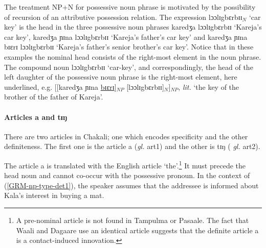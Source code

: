 \begin{exe}
\begin{exe}
\begin{exe}
{\begin{exe}
\begin{exe}
The treatment  NP+N for possessive noun phrase is   motivated  by the 
possibility of  recursion of  an attributive possession relation. The expression 
{\sls lɔɔlɪgbɛrbɪɪ}$_{N}$  `car key' is the head in the three possessive noun 
phrases   {\sls karedʒa lɔɔlɪgbɛrbɪɪ} `Kareja's car key', {\sls karedʒa ɲɪna 
lɔɔlɪgbɛrbɪɪ} `Kareja's father's car key' and {\sls karedʒa ɲɪna bɪɛrɪ 
lɔɔlɪgbɛrbɪɪ} `Kareja's father's senior brother's car  key'.  Notice that in 
these examples the nominal head consists of the right-most element in the noun 
phrase. The compound noun  {\sls  lɔɔlɪgbɛrbɪɪ}  `car-key', and correspondingly, 
the head of the left daughter of the  possessive noun phrase is the right-most 
element, here underlined,  e.g.   [[{\sls karedʒa ɲɪna 
\underline{bɪɛrɪ}}]$_{NP}$ [{\sls lɔɔlɪgbɛrbɪɪ}]$_{N}$]$_{NP}$, {\it lit.} `the 
key of the brother of the father of Kareja'. 









\paragraph{Articles a and tɪŋ}
\label{sec:GRM-np-def-articles}

There are two articles in Chakali; one which encodes specificity and the other
definiteness. The first one is the 
article {\sls a} ({\it gl.} {\sc art1}) and the other is  {\sls tɪŋ}  ({\it
gl.} {\sc art2}).  

The  article {\sls a} is translated with the English article
`the'.\footnote{A pre-nominal article is not found in Tampulma or Pasaale. The
fact that
Waali and Dagaare use an identical  article suggests that the definite article
{\sls a}
is a contact-induced innovation.} It must precede the head noun and cannot
co-occur with the possessive pronoun.  In the context of
(\ref{GRM-np-type-det1}), the speaker assumes that the addressee is informed 
about
Kala's interest in buying a mat. 



\end{exe}
\end{exe}}
\end{exe}
\end{exe}
\end{exe}
